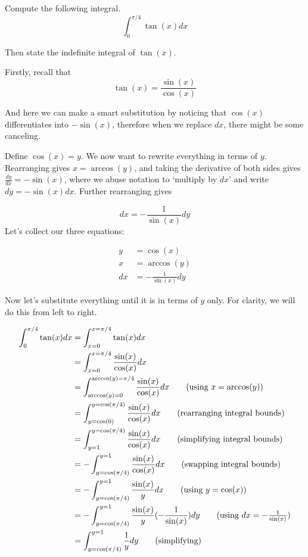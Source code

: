 \begin{example}
    Compute the following integral.
    \[ \int_{0}^{\pi/4} \tan(x) dx \]

    Then state the indefinite integral of $\tan(x)$.
\end{example}

\begin{solution}
    Firstly, recall that
    \[ \tan(x) = \frac{\sin(x)}{\cos(x)}\]

    And here we can make a smart substitution by noticing that $\cos(x)$ differentiates into $-\sin(x)$, therefore when we replace $dx$, 
    there might be some canceling.

    Define $\cos(x)= y$. We now want to rewrite everything in terms of $y$. Rearranging gives $x = \arccos(y)$, and taking the derivative of both sides gives
    $\frac{dy}{dx} = -\sin(x)$, where we abuse notation to `multiply by $dx$' and write $dy = -\sin(x)dx$. Further rearranging gives 

    \[ dx = -\frac{1}{\sin(x)}dy\] 
    Let's collect our three equations:

    \begin{align*}
        y &= \cos(x) \\
        x &= \arccos(y) \\
        dx &= -\frac{1}{\sin(x)}dy
    \end{align*}

    Now let's substitute everything until it is in terms of $y$ only. For clarity, we will do this from left to right.

    \begin{align*}
        \int_{0}^{\pi/4} \tan(x) dx  &= \int_{x=0}^{x=\pi/4} \tan(x) dx \\
         &= \int_{x=0}^{x=\pi/4} \frac{\sin(x)}{\cos(x)} dx \\
         &= \int_{\arccos(y)=0}^{\arccos(y)=\pi/4} \frac{\sin(x)}{\cos(x)} dx \tag{using $x = \arccos(y)$} \\
         &= \int_{y=\cos(0)}^{y=\cos(\pi/4)} \frac{\sin(x)}{\cos(x)} dx \tag{rearranging integral bounds} \\
         &= \int_{y=1}^{y=\cos(\pi/4)} \frac{\sin(x)}{\cos(x)} dx \tag{simplifying integral bounds} \\
         &= -\int_{y=\cos(\pi/4)}^{y=1} \frac{\sin(x)}{\cos(x)} dx \tag{swapping integral bounds} \\
         &= -\int_{y=\cos(\pi/4)}^{y=1} \frac{\sin(x)}{y} dx \tag{using $y = \cos(x)$} \\
         &= -\int_{y=\cos(\pi/4)}^{y=1} \frac{\sin(x)}{y}(-\frac{1}{\sin(x)}) dy \tag{using $dx = -\frac{1}{\sin(x)}$} \\
         &= \int_{y=\cos(\pi/4)}^{y=1} \frac{1}{y} dy \tag{simplifying} \\
    \end{align*}


\end{solution}
